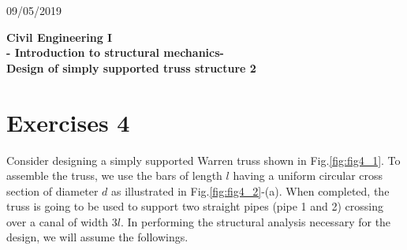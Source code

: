 \documentclass[10pt,a4j]{article}
\newlength{\minitwocolumn}
\begin{document}
\newcommand{\fat}[1]{\mbox{\boldmath $#1$}}
\newcommand{\D}{\partial}
\newcommand{\w}{\omega}
\newcommand{\ga}{\alpha}
\newcommand{\gb}{\beta}
\newcommand{\gx}{\xi}
\newcommand{\gz}{\zeta}
\newcommand{\vhat}[1]{\hat{\fat{#1}}}
\newcommand{\spc}{\vspace{0.7\baselineskip}}
\newcommand{\halfspc}{\vspace{0.3\baselineskip}}

\newcommand{\twofig}[2]
 {
   \begin{figure}
     \begin{minipage}[t]{\minitwocolumn}
         \begin{center}   #1
         \end{center}
     \end{minipage}
         \hspace{\columnsep}
     \begin{minipage}[t]{\minitwocolumn}
         \begin{center} #2
         \end{center}
     \end{minipage}
   \end{figure}
 }
\begin{flushright}
	09/05/2019
\end{flushright}
\begin{center}
	{\Large \bf Civil Engineering I \\
	- Introduction to structural mechanics-\\
	Design of simply supported truss structure 2
	}  \\
\end{center}
\section*{Exercises 4}
Consider designing a simply supported Warren truss shown in Fig.\ref{fig:fig4_1}.
To assemble the truss, we use the bars of length $l$ having a uniform circular 
cross section of diameter $d$ as illustrated in Fig.\ref{fig:fig4_2}-(a).
When completed, the truss is going to be used to support two straight pipes (pipe 1 and 2) 
crossing over a canal of width $3l$.
In performing the structural analysis necessary for the design, 
we will assume the followings.
\end{document}

